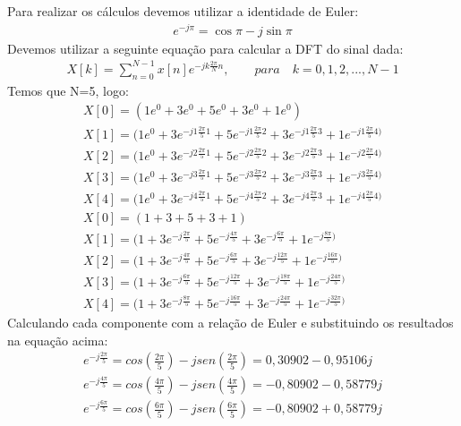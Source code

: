 \documentclass[12pt]{article}
\begin{document}
\begin{itemize}
\begin{itemize}
Para realizar os cálculos devemos utilizar a identidade de Euler:
\begin{align*}
    e^{-j \pi} = \cos \pi - j\sin\pi
\end{align*}
Devemos utilizar a seguinte equação para calcular a DFT do sinal dada:
\begin{align*}
    X[k] = \sum\limits_{n=0}^{N-1} x[n] e^{-jk\frac{2\pi}{N}n},\qquad para\quad k=0,1,2,...,N-1
\end{align*}
Temos que N=5, logo:
\begin{align*}
    &X[0] = (1e^0 + 3e^0 + 5e^0 + 3e^0 + 1e^0) &\\
    &X[1] = (1e^0 + 3e^{-j1\frac{2\pi}{5}1} + 5e^{-j1\frac{2\pi}{5}2} + 3e^{-j1\frac{2\pi}{5}3} + 1e^{-j1\frac{2\pi}{5}4)} &\\
    &X[2] = (1e^0 + 3e^{-j2\frac{2\pi}{5}1} + 5e^{-j2\frac{2\pi}{5}2} + 3e^{-j2\frac{2\pi}{5}3} + 1e^{-j2\frac{2\pi}{5}4)} &\\
    &X[3] = (1e^0 + 3e^{-j3\frac{2\pi}{5}1} + 5e^{-j3\frac{2\pi}{5}2} + 3e^{-j3\frac{2\pi}{5}3} + 1e^{-j3\frac{2\pi}{5}4)} &\\
    &X[4] = (1e^0 + 3e^{-j4\frac{2\pi}{5}1} + 5e^{-j4\frac{2\pi}{5}2} + 3e^{-j4\frac{2\pi}{5}3} + 1e^{-j4\frac{2\pi}{5}4)} &\\
    &X[0] = (1 + 3 + 5 + 3 + 1) &\\
    &X[1] = (1 + 3e^{-j\frac{2\pi}{5}} + 5e^{-j\frac{4\pi}{5}}  + 3e^{-j\frac{6\pi}{5}}  + 1e^{-j\frac{8\pi}{5})} &\\
    &X[2] = (1 + 3e^{-j\frac{4\pi}{5}} + 5e^{-j\frac{6\pi}{5}}  + 3e^{-j\frac{12\pi}{5}} + 1e^{-j\frac{16\pi}{5})} &\\
    &X[3] = (1 + 3e^{-j\frac{6\pi}{5}} + 5e^{-j\frac{12\pi}{5}} + 3e^{-j\frac{18\pi}{5}} + 1e^{-j\frac{24\pi}{5})} &\\
    &X[4] = (1 + 3e^{-j\frac{8\pi}{5}} + 5e^{-j\frac{16\pi}{5}} + 3e^{-j\frac{24\pi}{5}} + 1e^{-j\frac{32\pi}{5})}&
\end{align*}
Calculando cada componente com a relação de Euler e substituindo os resultados na equação acima:
\begin{align*}
    &e^{-j\frac{2\pi}{5}} = cos(\frac{2\pi}{5}) - jsen(\frac{2\pi}{5}) = 0,30902  - 0,95106j &\\
    &e^{-j\frac{4\pi}{5}} = cos(\frac{4\pi}{5}) - jsen(\frac{4\pi}{5}) = -0,80902 - 0,58779j &\\
    &e^{-j\frac{6\pi}{5}} = cos(\frac{6\pi}{5}) - jsen(\frac{6\pi}{5}) = -0,80902 + 0,58779j &\\

\end{align*}
\end{itemize}
\end{itemize}
\end{document}
